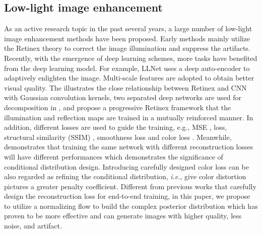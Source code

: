 \documentclass[letterpaper]{article} \usepackage{aaai22}  \usepackage{times}  \usepackage{helvet}  \usepackage{courier}  \usepackage[hyphens]{url}  \usepackage{graphicx} \urlstyle{rm} \def\UrlFont{\rm}  \usepackage{natbib}  \usepackage{caption} \usepackage{subfigure}
\def\ie{\emph{i.e.}}
\def\ie{{\emph{i.e.}}}
\begin{document}
\subsection{Low-light image enhancement}
As an active research topic in the past several years, a large number of low-light image enhancement methods have been proposed. Early methods mainly utilize the Retinex theory to correct the image illumination and suppress the artifacts. Recently, with the emergence of deep learning schemes, more tasks have benefited from the deep learning model. For example,  LLNet \cite{lore2017llnet} uses a deep auto-encoder to adaptively enlighten the image. Multi-scale features are adopted \cite{shen2017msr, tao2017llcnn, lv2018mbllen, ren2019low} to obtain better visual quality. The \cite{shen2017msr} illustrates the close relationship between Retinex and CNN with Gaussian convolution kernels, two separated deep networks are used for decomposition in \cite{wei2018deep}, and \cite{wang2019progressive} propose a progressive Retinex framework that the illumination and reflection maps are trained in a mutually reinforced manner. 
In addition, different losses are used to guide the training, e.g.,  MSE \cite{lore2017llnet, cai2018learning},  loss\cite{cai2018learning}, structural similarity (SSIM) \cite{cai2018learning}, smoothness loss \cite{wang2019underexposed,zhang2019kindling} and color loss \cite{wang2019underexposed, guo2020zero, shen2017msr}. Meanwhile, \cite{cai2018learning} demonstrates that training the same network with different reconstruction losses will have different performances which demonstrates the significance of conditional distribution design. Introducing carefully designed color loss can be also regarded as refining the conditional distribution, 
\ie, give color distortion pictures a greater penalty coefficient. 
Different from previous works that carefully design the reconstruction loss for end-to-end training, in this paper, we propose to utilize a normalizing flow to build the complex posterior distribution which has proven to be more effective and can generate images with higher quality, less noise, and artifact.  
\end{document}
